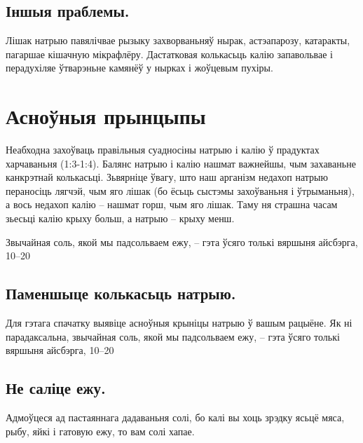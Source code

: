 \subsection{Іншыя праблемы.}
Лішак натрыю павялічвае рызыку захворваньняў нырак, астэапарозу, катаракты, пагаршае кішачную мікрафлёру. Дастатковая колькасьць калію запавольвае і перадухіляе ўтварэньне камянёў у нырках і жоўцевым пухіры.

\section{Асноўныя прынцыпы}

Неабходна захоўваць правільныя суадносіны натрыю і калію ў прадуктах харчаваньня (1:3-1:4). Балянс натрыю і калію нашмат важнейшы, чым захаваньне канкрэтнай колькасьці. Зьвярніце ўвагу, што наш арганізм недахоп натрыю пераносіць лягчэй, чым яго лішак (бо ёсьць сыстэмы захоўваньня і ўтрыманьня), а вось недахоп калію – нашмат горш, чым яго лішак. Таму ня страшна часам зьесьці калію крыху больш, а натрыю – крыху менш.

Звычайная соль, якой мы падсольваем ежу, – гэта ўсяго толькі вяршыня айсбэрга, 10–20%

\subsection{Паменшыце колькасьць натрыю.}
Для гэтага спачатку выявіце асноўныя крыніцы натрыю ў вашым рацыёне. Як ні парадаксальна, звычайная соль, якой мы падсольваем ежу, – гэта ўсяго толькі вяршыня айсбэрга, 10–20%

\subsection{Не саліце ежу.}
Адмоўцеся ад пастаяннага дадаваньня солі, бо калі вы хоць зрэдку ясьцё мяса, рыбу, яйкі і гатовую ежу, то вам солі хапае.

